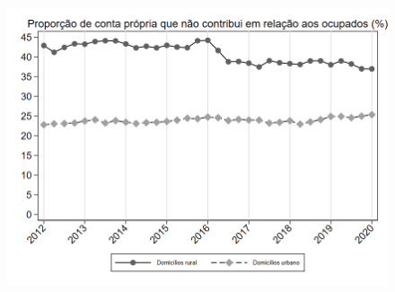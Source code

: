 \begin{frame}[label=_composicao_demografica_rural_urbano_prop_cpropriaNc]{}
\textit{\hyperlink{_composicao_demografica_rural_urbano}{}}
\begin{figure}
  \centering
  \includegraphics[width=1.0\linewidth]{../../analysis/output/composicao_demografica/area_geografica/_composicao_demografica_rural_urbano_prop_cpropriaNc.png}
  \caption{}
  \label{fig:_composicao_demografica_rural_urbano_prop_cpropriaNc}
\end{figure}
\end{frame}